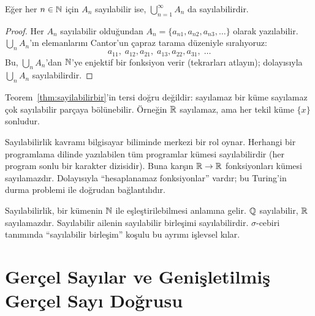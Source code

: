 \begin{teorem}\label{thm:sayilabilirbir}
Eğer her $n \in \mathbb{N}$ için $A_n$ sayılabilir ise,
$\bigcup_{n=1}^\infty A_n$ da sayılabilirdir.
\end{teorem}

\begin{proof}
Her $A_n$ sayılabilir olduğundan $A_n = \{a_{n1}, a_{n2}, a_{n3}, \ldots\}$
olarak yazılabilir. $\bigcup_n A_n$'ın elemanlarını Cantor'un çapraz tarama
düzeniyle sıralıyoruz:
\[
  a_{11},\; a_{12}, a_{21},\; a_{13}, a_{22}, a_{31},\; \ldots
\]
Bu, $\bigcup_n A_n$'dan $\mathbb{N}$'ye enjektif bir fonksiyon verir (tekrarları atlayın);
dolayısıyla $\bigcup_n A_n$ sayılabilirdir.
\end{proof}

\begin{notkutu}
Teorem~\ref{thm:sayilabilirbir}'in tersi doğru değildir: sayılamaz bir küme
sayılamaz çok sayılabilir parçaya bölünebilir. Örneğin $\mathbb{R}$ sayılamaz,
ama her tekil küme $\{x\}$ sonludur.
\end{notkutu}

\begin{disiplinlerarasibaglan}
Sayılabilirlik kavramı bilgisayar biliminde merkezi bir rol oynar.
Herhangi bir programlama dilinde yazılabilen tüm programlar kümesi sayılabilirdir
(her program sonlu bir karakter dizisidir). Buna karşın $\mathbb{R} \to \mathbb{R}$
fonksiyonları kümesi sayılamazdır. Dolayısıyla ``hesaplanamaz fonksiyonlar'' vardır;
bu Turing'in durma problemi ile doğrudan bağlantılıdır.
\end{disiplinlerarasibaglan}

\begin{mikroozet}[§0.3 özeti]
Sayılabilirlik, bir kümenin $\mathbb{N}$ ile eşleştirilebilmesi anlamına gelir.
$\mathbb{Q}$ sayılabilir, $\mathbb{R}$ sayılamazdır. Sayılabilir ailenin sayılabilir
birleşimi sayılabilirdir. $\sigma$-cebiri tanımında ``sayılabilir birleşim'' koşulu
bu ayrımı işlevsel kılar.
\end{mikroozet}


\section{Gerçel Sayılar ve Genişletilmiş Gerçel Sayı Doğrusu}

